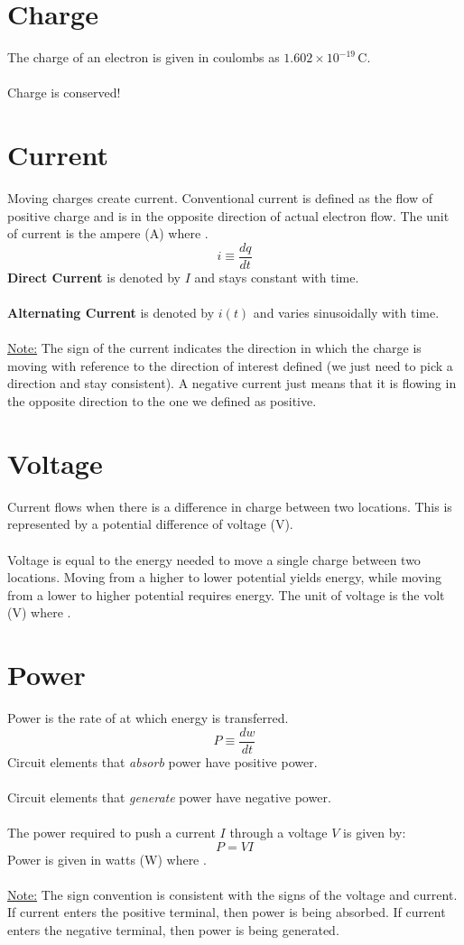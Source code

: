 \documentclass[12pt]{article}
\begin{document}
\section*{Charge}
The charge of an electron is given in coulombs as $\boxed{1.602 \times 10^{-19}\,\text{C}}$.\\\\
Charge is conserved!
\section*{Current}
Moving charges create current. Conventional current is defined as the flow of positive charge and is in the opposite direction of actual electron flow. The unit of current is the ampere (A) where .
\[\boxed{i\equiv\frac{dq}{dt}}\]
\textbf{Direct Current} is denoted by $I$ and stays constant with time.\\\\
\textbf{Alternating Current} is denoted by $i(t)$ and varies sinusoidally with time.\\\\
\underline{Note:} The sign of the current indicates the direction in which the charge is moving with reference to the direction of interest defined (we just need to pick a direction and stay consistent). A negative current just means that it is flowing in the opposite direction to the one we defined as positive.
\section*{Voltage}
Current flows when there is a difference in charge between two locations. This is represented by a potential difference of voltage (V).\\\\
Voltage is equal to the energy needed to move a single charge between two locations. Moving from a higher to lower potential yields energy, while moving from a lower to higher potential requires energy. The unit of voltage is the volt (V) where .
\section*{Power}
Power is the rate of at which energy is transferred.
\[\boxed{P \equiv \frac{dw}{dt}}\]
Circuit elements that \textit{absorb} power have positive power.\\\\
Circuit elements that \textit{generate} power have negative power.\\\\
The power required to push a current $I$ through a voltage $V$ is given by:
\[\boxed{P = VI}\]
Power is given in watts (W) where .\\\\
\underline{Note:} The sign convention is consistent with the signs of the voltage and current. If current enters the positive terminal, then power is being absorbed. If current enters the negative terminal, then power is being generated.
\end{document}
